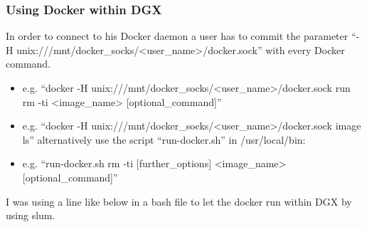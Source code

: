 \documentclass[letterpaper,10pt,english]{sphinxmanual}
\begin{document}
\subsubsection{Using Docker within DGX}
\label{\detokenize{usage/installation:using-docker-within-dgx}}
 In order to connect to his Docker daemon a user has to commit the parameter “-H unix:///mnt/docker\_socks/\textless{}user\_name\textgreater{}/docker.sock” with every Docker command.
\begin{itemize}
\item {} 
e.g. “docker -H unix:///mnt/docker\_socks/\textless{}user\_name\textgreater{}/docker.sock run \textendash{}rm -ti \textless{}image\_name\textgreater{} {[}optional\_command{]}”

\item {} 
e.g. “docker -H unix:///mnt/docker\_socks/\textless{}user\_name\textgreater{}/docker.sock image ls” alternatively use the script “run-docker.sh” in /usr/local/bin:

\item {} 
e.g. “run-docker.sh \textendash{}rm -ti {[}further\_options{]} \textless{}image\_name\textgreater{} {[}optional\_command{]}”

\end{itemize}

I was using a line like below in a bash file to let the docker run within DGX by using slum.

%
\begin{sphinxVerbatim}[commandchars=\\\{\}]
\end{sphinxVerbatim}
\end{document}
